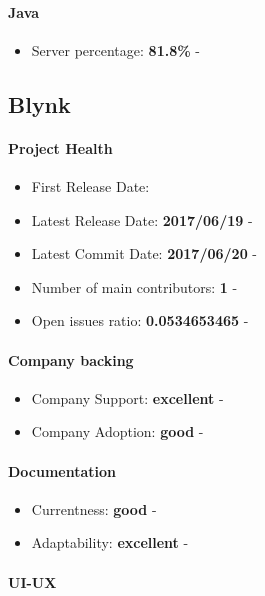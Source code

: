 \documentclass{article}
\begin{document}
\paragraph{Java} 

\begin{itemize}
\item Server percentage: \textbf{81.8\%} - 
\end{itemize}

\subsection{Blynk}

\paragraph{Project Health}

\begin{itemize}
\item First Release Date: 
\item Latest Release Date: \textbf{2017/06/19} - 
\item Latest Commit Date: \textbf{2017/06/20} - 
\item Number of main contributors: \textbf{1} - 
\item Open issues ratio: \textbf{0.0534653465} - 
\end{itemize}

\paragraph{Company backing}

\begin{itemize}
\item Company Support: \textbf{excellent} - 
\item Company Adoption: \textbf{good} - 
\end{itemize}

\paragraph{Documentation}

\begin{itemize}
\item Currentness: \textbf{good} - 
\item Adaptability: \textbf{excellent} - 
\end{itemize}

\paragraph{UI-UX}
\end{document}
